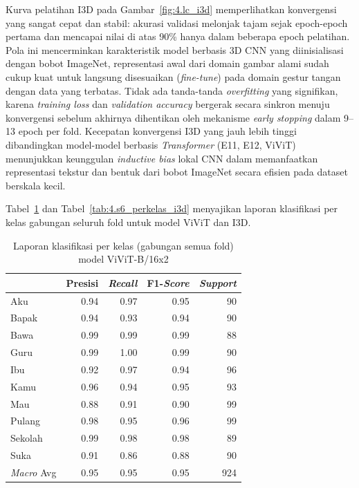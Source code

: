 Kurva pelatihan I3D pada Gambar~\ref{fig:4.lc_i3d} memperlihatkan konvergensi yang sangat cepat dan stabil: akurasi validasi melonjak tajam sejak epoch-epoch pertama dan mencapai nilai di atas 90\% hanya dalam beberapa epoch pelatihan. Pola ini mencerminkan karakteristik model berbasis 3D CNN yang diinisialisasi dengan bobot ImageNet, representasi awal dari domain gambar alami sudah cukup kuat untuk langsung disesuaikan (\textit{fine-tune}) pada domain gestur tangan dengan data yang terbatas. Tidak ada tanda-tanda \textit{overfitting} yang signifikan, karena \textit{training loss} dan \textit{validation accuracy} bergerak secara sinkron menuju konvergensi sebelum akhirnya dihentikan oleh mekanisme \textit{early stopping} dalam 9--13 epoch per fold. Kecepatan konvergensi I3D yang jauh lebih tinggi dibandingkan model-model berbasis \textit{Transformer} (E11, E12, ViViT) menunjukkan keunggulan \textit{inductive bias} lokal CNN dalam memanfaatkan representasi tekstur dan bentuk dari bobot ImageNet secara efisien pada dataset berskala kecil.\par

Tabel~\ref{tab:4.s6_perkelas_vivit} dan Tabel~\ref{tab:4.s6_perkelas_i3d} menyajikan laporan klasifikasi per kelas gabungan seluruh fold untuk model ViViT dan I3D.\par

\begin{table}[H]
\centering
\caption{Laporan klasifikasi per kelas (gabungan semua fold) model ViViT-B/16x2}
\label{tab:4.s6_perkelas_vivit}
\footnotesize
\begin{tabular}{|l|r|r|r|r|}
\hline
\rowcolor{gray!15} \multicolumn{1}{|c|}{Kelas} & \multicolumn{1}{c|}{Presisi} & \multicolumn{1}{c|}{\textit{Recall}} & \multicolumn{1}{c|}{F1-\textit{Score}} & \multicolumn{1}{c|}{\textit{Support}} \\
\hline
Aku     & 0.94 & 0.97 & 0.95 & 90 \\
Bapak   & 0.94 & 0.93 & 0.94 & 90 \\
Bawa    & 0.99 & 0.99 & 0.99 & 88 \\
Guru    & 0.99 & 1.00 & 0.99 & 90 \\
Ibu     & 0.92 & 0.97 & 0.94 & 96 \\
Kamu    & 0.96 & 0.94 & 0.95 & 93 \\
Mau     & 0.88 & 0.91 & 0.90 & 99 \\
Pulang  & 0.98 & 0.95 & 0.96 & 99 \\
Sekolah & 0.99 & 0.98 & 0.98 & 89 \\
Suka    & 0.91 & 0.86 & 0.88 & 90 \\
\hline
\textit{Macro} Avg & 0.95 & 0.95 & 0.95 & 924 \\
\hline
\end{tabular}
\end{table}

